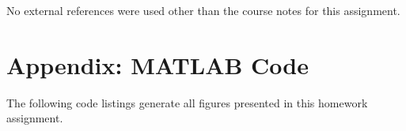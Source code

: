 \documentclass[11pt]{article}
\begin{document}
No external references were used other than the course notes for this assignment.

\section*{Appendix: MATLAB Code} %

The following code listings generate all figures presented in this homework assignment.


\end{document}
